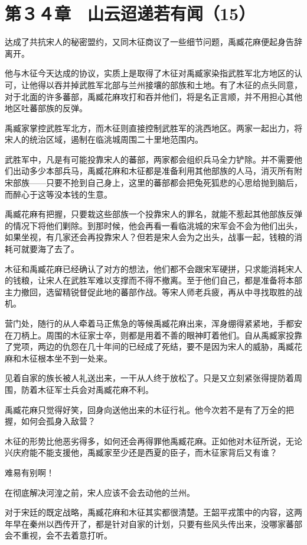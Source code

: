 \section{第３４章　山云迢递若有闻（15）}

达成了共抗宋人的秘密盟约，又同木征商议了一些细节问题，禹臧花麻便起身告辞离开。

他与木征今天达成的协议，实质上是取得了木征对禹臧家染指武胜军北方地区的认可，让他得以吞并掉武胜军北部与兰州接壤的部族和土地。有了木征的点头同意，对于北面的许多蕃部，禹臧花麻攻打和吞并他们，将是名正言顺，并不用担心其他地区吐蕃部族的反弹。

禹臧家掌控武胜军北方，而木征则直接控制武胜军的洮西地区。两家一起出力，将宋人的统治区域，遏制在临洮城周围二十里地范围内。

武胜军中，凡是有可能投靠宋人的蕃部，两家都会组织兵马全力铲除。并不需要他们出动多少本部兵马，禹臧花麻和木征都是准备利用其他部族的人马，消灭所有附宋部族——只要不抢到自己身上，这里的蕃部都会把兔死狐悲的心思给抛到脑后，而醉心于这等没本钱的生意。

禹臧花麻有把握，只要栽这些部族一个投靠宋人的罪名，就能不惹起其他部族反弹的情况下将他们剿除。到那时候，他会再看一看临洮城的宋军会不会为他们出头，如果坐视，有几家还会再投靠宋人？但若是宋人会为之出头，战事一起，钱粮的消耗可就要海了去了。

木征和禹臧花麻已经确认了对方的想法，他们都不会跟宋军硬拼，只求能消耗宋人的钱粮，让宋人在武胜军难以支撑而不得不撤离。至于他们自己，都是准备将本部主力撤回，选留精锐督促此地的蕃部作战。等宋人师老兵疲，再从中寻找取胜的战机。

营门处，随行的从人牵着马正焦急的等候禹臧花麻出来，浑身绷得紧紧地，手都安在刀柄上。周围的木征家士卒，则都是用着不善的眼神盯着他们。自从禹臧家投靠了党项，两边的仇怨在几十年间的已经成了死结，要不是因为宋人的威胁，禹臧花麻和木征根本坐不到一处来。

见着自家的族长被人礼送出来，一干从人终于放松了。只是又立刻紧张得提防着周围，防着木征军士兵会对禹臧花麻不利。

禹臧花麻只觉得好笑，回身向送他出来的木征行礼。他今次若不是有了万全的把握，如何会孤身入敌营？

木征的形势比他恶劣得多，如何还会再得罪他禹臧花麻。正如他对木征所说，无论兴庆府能不能支援他，禹臧家至少还是西夏的臣子，而木征家背后又有谁？

难易有别啊！

在彻底解决河湟之前，宋人应该不会去动他的兰州。

对于宋廷的既定战略，禹臧花麻和木征其实都很清楚。王韶平戎策中的内容，这两年早在秦州以西传开了，都是针对自家的计划，只要有些风头传出来，没哪家蕃部会不重视，会不去着意打听。

